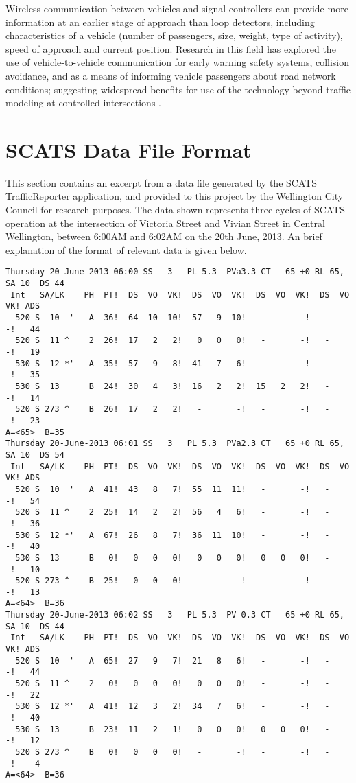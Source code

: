 \begin{appendices}
Wireless communication between vehicles and signal controllers can provide more information at an earlier stage of approach than loop detectors, including characteristics of a vehicle (number of passengers, size, weight, type of activity), speed of approach and current position. Research in this field has explored the use of vehicle-to-vehicle communication for early warning safety systems, collision avoidance, and as a means of informing vehicle passengers about road network conditions; suggesting widespread benefits for use of the technology beyond traffic modeling at controlled intersections \cite{nadeem2004trafficview,yang2004vehicle}.

\chapter{SCATS Data File Format}
\label{appendix:scats_data_file}

This section contains an excerpt from a data file generated by the SCATS TrafficReporter application, and provided to this project by the Wellington City Council for research purposes. The data shown represents three cycles of SCATS operation at the intersection of Victoria Street and Vivian Street in Central Wellington, between 6:00AM and 6:02AM on the 20th June, 2013. An brief explanation of the format of relevant data is given below.

\begin{verbatim}
Thursday 20-June-2013 06:00 SS   3   PL 5.3  PVa3.3 CT   65 +0 RL 65, SA 10  DS 44
 Int   SA/LK    PH  PT!  DS  VO  VK!  DS  VO  VK!  DS  VO  VK!  DS  VO  VK! ADS
  520 S  10  '   A  36!  64  10  10!  57   9  10!   -       -!   -       -!   44
  520 S  11 ^    2  26!  17   2   2!   0   0   0!   -       -!   -       -!   19
  530 S  12 *'   A  35!  57   9   8!  41   7   6!   -       -!   -       -!   35
  530 S  13      B  24!  30   4   3!  16   2   2!  15   2   2!   -       -!   14
  520 S 273 ^    B  26!  17   2   2!   -       -!   -       -!   -       -!   23
A=<65>  B=35
Thursday 20-June-2013 06:01 SS   3   PL 5.3  PVa2.3 CT   65 +0 RL 65, SA 10  DS 54
 Int   SA/LK    PH  PT!  DS  VO  VK!  DS  VO  VK!  DS  VO  VK!  DS  VO  VK! ADS
  520 S  10  '   A  41!  43   8   7!  55  11  11!   -       -!   -       -!   54
  520 S  11 ^    2  25!  14   2   2!  56   4   6!   -       -!   -       -!   36
  530 S  12 *'   A  67!  26   8   7!  36  11  10!   -       -!   -       -!   40
  530 S  13      B   0!   0   0   0!   0   0   0!   0   0   0!   -       -!   10
  520 S 273 ^    B  25!   0   0   0!   -       -!   -       -!   -       -!   13
A=<64>  B=36
Thursday 20-June-2013 06:02 SS   3   PL 5.3  PV 0.3 CT   65 +0 RL 65, SA 10  DS 44
 Int   SA/LK    PH  PT!  DS  VO  VK!  DS  VO  VK!  DS  VO  VK!  DS  VO  VK! ADS
  520 S  10  '   A  65!  27   9   7!  21   8   6!   -       -!   -       -!   44
  520 S  11 ^    2   0!   0   0   0!   0   0   0!   -       -!   -       -!   22
  530 S  12 *'   A  41!  12   3   2!  34   7   6!   -       -!   -       -!   40
  530 S  13      B  23!  11   2   1!   0   0   0!   0   0   0!   -       -!   12
  520 S 273 ^    B   0!   0   0   0!   -       -!   -       -!   -       -!    4
A=<64>  B=36
\end{verbatim}


\end{appendices}
